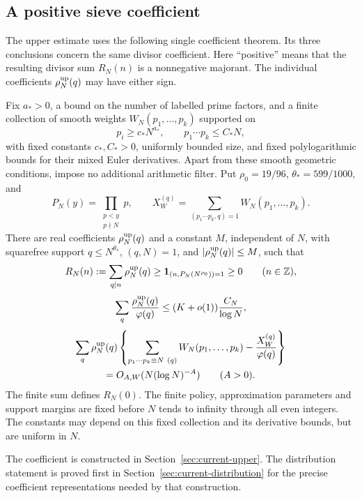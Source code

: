 \subsection{A positive sieve coefficient}
The upper estimate uses the following single coefficient theorem.
Its three conclusions concern the same divisor coefficient.
Here ``positive'' means that the resulting divisor sum $R_N(n)$ is
a nonnegative majorant. The individual coefficients $\rho_N^{\rm up}(q)$
may have either sign.

\begin{theorem}
\label{thm:positive-coefficient}
Fix $a_*>0$, a bound on the number of labelled prime factors, and a
finite collection of smooth weights $W_N(p_1,\ldots,p_k)$ supported on
\[
 p_i\ge c_*N^{a_*},\qquad p_1\cdots p_k\le C_*N,
\]
with fixed constants $c_*,C_*>0$, uniformly bounded size, and fixed
polylogarithmic bounds for their mixed Euler derivatives. Apart from
these smooth geometric conditions, impose no additional arithmetic
filter. Put $\rho_0=19/96$, $\theta_*=599/1000$, and
\[
 P_N(y)=\prod_{\substack{p<y\\p\nmid N}}p,\qquad
 X_W^{(q)}=\sum_{(p_1\cdots p_k,q)=1}W_N(p_1,\ldots,p_k).
\]
There are real coefficients $\rho_N^{\rm up}(q)$ and a constant $M$, independent
of $N$, with squarefree support $q\le N^{\theta_*}$, $(q,N)=1$,
and $|\rho_N^{\rm up}(q)|\le M$, such that
\begin{equation}
 R_N(n):=\sum_{q\mid n}\rho_N^{\rm up}(q)
   \ge\mathbf 1_{(n,P_N(N^{\rho_0}))=1}\ge0
                           \qquad(n\in\mathbb Z),\label{eq:core-positivity}
\end{equation}
\begin{equation}
 \sum_q\frac{\rho_N^{\rm up}(q)}{\varphi(q)}
   \le(K+o(1))\frac{C_N}{\log N},\label{eq:core-density}
\end{equation}
\begin{multline}
 \sum_q\rho_N^{\rm up}(q)\left\{
 \sum_{p_1\cdots p_k\equiv N\ (q)}W_N(p_1,\ldots,p_k)
       -\frac{X_W^{(q)}}{\varphi(q)}\right\}\\
   =O_{A,W}(N(\log N)^{-A})\qquad(A>0).
                           \label{eq:core-distribution}
\end{multline}
The finite sum defines $R_N(0)$. The finite policy, approximation
parameters and support margins are fixed before $N$ tends to infinity
through all even integers. The constants may depend on this fixed
collection and its derivative bounds, but are uniform in $N$.
\end{theorem}

The coefficient is constructed in Section~\ref{sec:current-upper}.
The distribution statement is proved first in
Section~\ref{sec:current-distribution} for the precise coefficient
representations needed by that construction.
